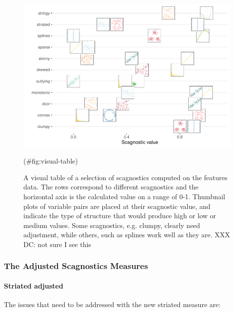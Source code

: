 \begin{Schunk}
\begin{figure}
\includegraphics[width=1\linewidth]{mason-lee-laa-cook_files/figure-latex/visual-table-1} \caption[A visual table of a selection of scagnostics computed on the features data]{A visual table of a selection of scagnostics computed on the features data. The rows correspond to different scagnostics and the horizontal axis is the calculated value on a range of 0-1. Thumbnail plots of variable pairs are placed at their scagnostic value, and indicate the type of structure that would produce high or low or medium values. Some scagnostics, e.g. clumpy, clearly need adjustment, while others, such as splines work well as they are. XXX DC: not sure I see this}(\#fig:visual-table)
\end{figure}
\end{Schunk}

\hypertarget{the-adjusted-scagnostics-measures}{%
\subsubsection{The Adjusted Scagnostics
Measures}\label{the-adjusted-scagnostics-measures}}

\hypertarget{striated-adjusted}{%
\paragraph{Striated adjusted}\label{striated-adjusted}}

The issues that need to be addressed with the new striated measure are:

